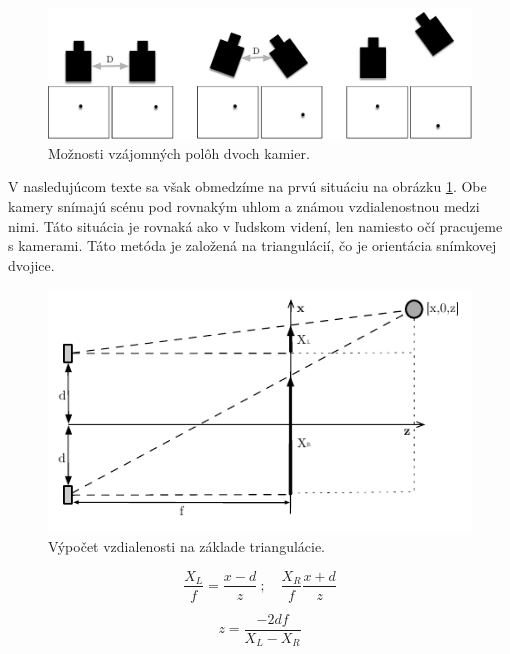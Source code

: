 \begin{figure}[H]
\begin{center}
	\includegraphics[scale=0.5]{images/3D_cameraPos}
	\caption{Možnosti vzájomných polôh dvoch kamier.}
	\label{sec:posCam}
	\end{center}
\end{figure}


V nasledujúcom texte sa však obmedzíme na prvú situáciu na obrázku \ref{sec:posCam}. Obe kamery snímajú scénu pod rovnakým uhlom a známou vzdialenostnou medzi nimi. Táto situácia je rovnaká ako v ľudskom videní, len namiesto očí pracujeme s kamerami. Táto metóda je založená na triangulácií, čo je orientácia snímkovej dvojice. \cite{Algorithms_and_Applications} 

\begin{figure}[H]
\begin{center}
	\includegraphics[scale=1.4]{images/stereoscope}
	\caption{Výpočet vzdialenosti na základe triangulácie.}
	\end{center}
\end{figure}


\begin{figure}[H]
    \centering
    \begin{minipage}[b]{0.49\textwidth}
        \begin{equation}
            \frac{X_L}{f}=\frac{x-d}{z}\ {;}\quad \frac{X_R}{f}\frac{x+d}{z}
        \end{equation}
    \end{minipage}
    \hfill
    \begin{minipage}[b]{0.49\textwidth}
        \begin{equation}
            z=\frac{-2df}{X_L-X_R}
       \end{equation}
    \end{minipage}
\end{figure}



